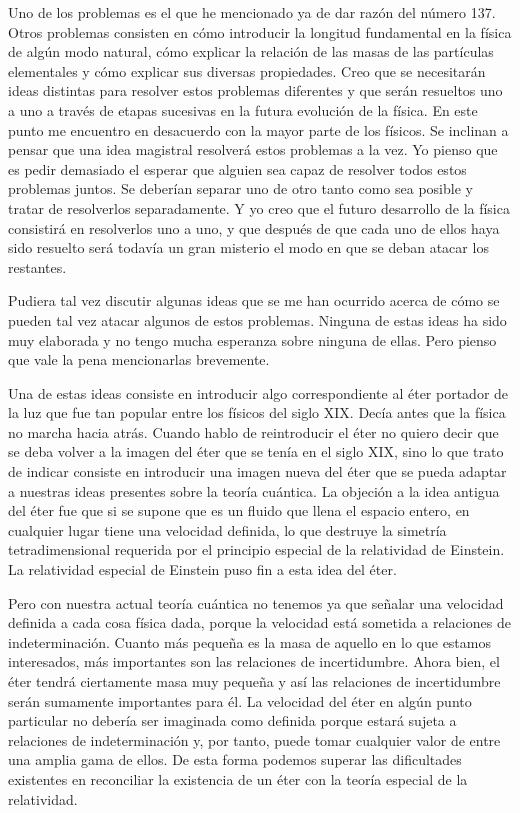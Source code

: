 \documentclass[a4paper, 12pt]{article}
\begin{document}
Uno de los problemas es el que he mencionado ya de dar razón del número 137. Otros problemas consisten en cómo introducir la longitud fundamental en la física de algún modo natural, cómo explicar la relación de las masas de las partículas elementales y cómo explicar sus diversas propiedades. Creo que se necesitarán ideas distintas para resolver estos problemas diferentes y que serán resueltos uno a uno a través de etapas sucesivas en la futura evolución de la física. En este punto me encuentro en desacuerdo con la mayor parte de los físicos. Se inclinan a pensar que una idea magistral resolverá estos problemas a la vez. Yo pienso que es pedir demasiado el esperar que alguien sea capaz de resolver todos estos problemas juntos. Se deberían separar uno de otro tanto como sea posible y tratar de  resolverlos separadamente. Y yo creo que el futuro desarrollo de la física consistirá en resolverlos uno a uno, y que después de que cada uno de ellos haya sido resuelto será todavía un gran misterio el modo en que se deban atacar los restantes.

Pudiera tal vez discutir algunas ideas que se me han ocurrido acerca de cómo se pueden tal vez atacar algunos de estos problemas. Ninguna de estas ideas ha sido muy elaborada y no tengo mucha esperanza sobre ninguna de ellas. Pero pienso que vale la pena mencionarlas brevemente.

Una de estas ideas consiste en introducir algo correspondiente al éter portador de la luz que fue tan popular entre los físicos del siglo XIX. Decía antes que la física no marcha hacia atrás. Cuando hablo de reintroducir el éter no quiero decir que se deba volver a la imagen del éter que se tenía en el siglo XIX, sino lo que trato de indicar consiste en introducir una imagen nueva del éter que se pueda adaptar a nuestras ideas presentes sobre la teoría cuántica. La objeción a la idea antigua del éter fue que si se supone que es un fluido que llena el espacio entero, en cualquier lugar tiene una velocidad definida, lo que destruye la simetría tetradimensional requerida por el principio especial de la relatividad de Einstein. La relatividad especial de Einstein puso fin a esta idea del éter.



Pero con nuestra actual teoría cuántica no tenemos ya que señalar una velocidad definida a cada cosa física dada, porque la velocidad está sometida a relaciones de indeterminación. Cuanto más pequeña es la masa de aquello en lo que estamos interesados, más importantes son las relaciones de incertidumbre. Ahora bien, el éter tendrá ciertamente masa muy pequeña y así las relaciones de incertidumbre serán sumamente importantes para él. La velocidad del éter en algún punto particular no debería ser imaginada como definida porque estará sujeta a relaciones de indeterminación y, por tanto, puede tomar cualquier valor de entre una amplia gama de ellos. De esta forma podemos superar las dificultades existentes en reconciliar la existencia de un éter con la teoría especial de la relatividad.
\end{document}
